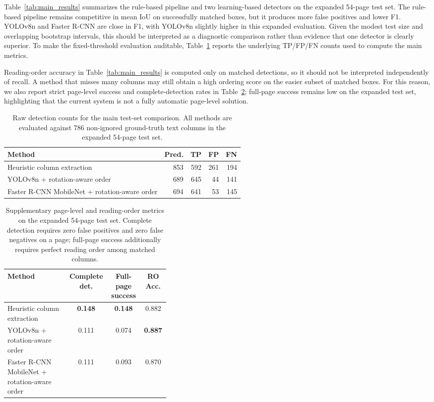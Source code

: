\documentclass[pdflatex,sn-mathphys-num]{sn-jnl}
\begin{document}
Table~\ref{tab:main_results} summarizes the rule-based pipeline and two learning-based detectors on the expanded 54-page test set. The rule-based pipeline remains competitive in mean IoU on successfully matched boxes, but it produces more false positives and lower F1. YOLOv8n and Faster R-CNN are close in F1, with YOLOv8n slightly higher in this expanded evaluation. Given the modest test size and overlapping bootstrap intervals, this should be interpreted as a diagnostic comparison rather than evidence that one detector is clearly superior. To make the fixed-threshold evaluation auditable, Table~\ref{tab:main_counts} reports the underlying TP/FP/FN counts used to compute the main metrics.

Reading-order accuracy in Table~\ref{tab:main_results} is computed only on matched detections, so it should not be interpreted independently of recall. A method that misses many columns may still obtain a high ordering score on the easier subset of matched boxes. For this reason, we also report strict page-level success and complete-detection rates in Table~\ref{tab:enhanced_order}; full-page success remains low on the expanded test set, highlighting that the current system is not a fully automatic page-level solution.

\begin{table}[t]
\centering
\scriptsize\setlength{\tabcolsep}{3pt}
\caption{Raw detection counts for the main test-set comparison. All methods are evaluated against 786 non-ignored ground-truth text columns in the expanded 54-page test set.}
\label{tab:main_counts}
\begin{tabular}{lrrrr}
\toprule
Method & Pred. & TP & FP & FN \\
\midrule
Heuristic column extraction & 853 & 592 & 261 & 194 \\
YOLOv8n + rotation-aware order & 689 & 645 & 44 & 141 \\
Faster R-CNN MobileNet + rotation-aware order & 694 & 641 & 53 & 145 \\
\bottomrule
\end{tabular}
\end{table}

\begin{table}[t]
\centering
\scriptsize\setlength{\tabcolsep}{3pt}
\caption{Supplementary page-level and reading-order metrics on the expanded 54-page test set. Complete detection requires zero false positives and zero false negatives on a page; full-page success additionally requires perfect reading order among matched columns.}
\label{tab:enhanced_order}
\begin{tabular}{p{0.38\linewidth}ccc}
\toprule
Method & Complete det. & Full-page success & RO Acc. \\
\midrule
Heuristic column extraction & \textbf{0.148} & \textbf{0.148} & 0.882 \\
YOLOv8n + rotation-aware order & 0.111 & 0.074 & \textbf{0.887} \\
Faster R-CNN MobileNet + rotation-aware order & 0.111 & 0.093 & 0.870 \\
\bottomrule
\end{tabular}
\end{table}
\end{document}
